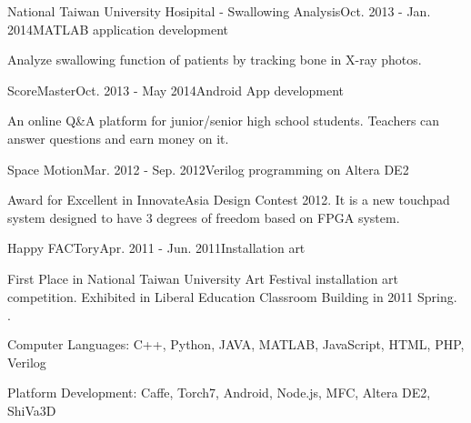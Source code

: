 \documentclass{joel_cv}
\begin{document}
\begin{sectionContentNormal}{National Taiwan University Hosipital - Swallowing Analysis}{Oct. 2013 - Jan. 2014}{MATLAB application development}
	\item Analyze swallowing function of patients by tracking bone in X-ray photos.
\end{sectionContentNormal}

\begin{sectionContentNormal}{ScoreMaster}{Oct. 2013 - May 2014}{Android App development}
	\item An online Q\&A platform for junior/senior high school students. Teachers can answer questions and earn money on it.
\end{sectionContentNormal}

\begin{sectionContentNormal}{Space Motion}{Mar. 2012 - Sep. 2012}{Verilog programming on Altera DE2}
	\item Award for Excellent in InnovateAsia Design Contest 2012. It is a new touchpad system designed to have 3 degrees of freedom based on FPGA system.
\end{sectionContentNormal}

\begin{sectionContentNormal}{Happy FACTory}{Apr. 2011 - Jun. 2011}{Installation art}
	\item First Place in National Taiwan University Art Festival installation art competition. Exhibited in Liberal Education Classroom Building in 2011 Spring.
\end{sectionContentNormal}

%
%

\begin{sectionItemize}{$\cdot$}
	\item Computer Languages: C++, Python, JAVA, MATLAB, JavaScript, HTML, PHP, Verilog
	\item Platform Development: Caffe, Torch7, Android, Node.js, MFC, Altera DE2, ShiVa3D
\end{sectionItemize}
\end{document}
